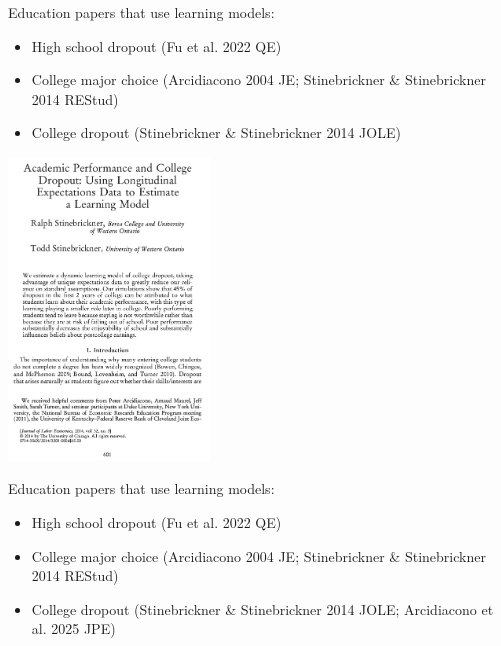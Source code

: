 \documentclass[aspectratio=169]{beamer}
\begin{document}
\begin{frame}
Education papers that use learning models:
\bigskip\par
\begin{itemize}
\itemsep1.5em
\item High school dropout (Fu et al. 2022 QE)
\item College major choice (Arcidiacono 2004 JE; Stinebrickner \& Stinebrickner 2014 REStud)
\item College dropout (Stinebrickner \& Stinebrickner 2014 JOLE)
\end{itemize}
\end{frame}

\begin{frame}
\centering
\includegraphics[width=0.4\textwidth]{Stinebrickner2_2014_JOLE_cover.jpg}
\end{frame}


\begin{frame}
Education papers that use learning models:
\bigskip\par
\begin{itemize}
\itemsep1.5em
\item High school dropout (Fu et al. 2022 QE)
\item College major choice (Arcidiacono 2004 JE; Stinebrickner \& Stinebrickner 2014 REStud)
\item College dropout (Stinebrickner \& Stinebrickner 2014 JOLE; Arcidiacono et al. 2025 JPE)
\end{itemize}
\end{frame}
\end{document}
